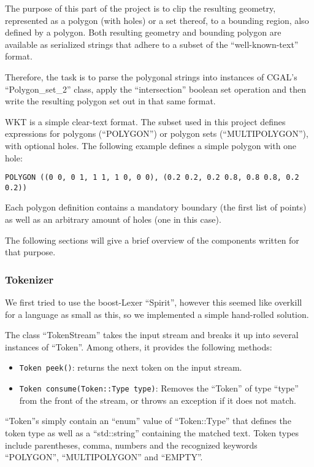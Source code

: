 The purpose of this part of the project is to clip the resulting geometry, represented as a
polygon (with holes) or a set thereof, to a bounding region, also defined by a polygon.
Both resulting geometry and bounding polygon are available as serialized strings that adhere to
a subset of the ``well-known-text'' format.

Therefore, the task is to parse the polygonal strings into instances of CGAL's ``Polygon\_set\_2''
class, apply the ``intersection'' boolean set operation and then write the resulting polygon set
out in that same format.

WKT is a simple clear-text format. The subset used in this project defines expressions for polygons
(``POLYGON'') or polygon sets (``MULTIPOLYGON''), with optional holes.
The following example defines a simple polygon with one hole:

\texttt{POLYGON ((0 0, 0 1, 1 1, 1 0, 0 0), (0.2 0.2, 0.2 0.8, 0.8 0.8, 0.2 0.2))}

Each polygon definition contains a mandatory boundary (the first list of points) as well as an
arbitrary amount of holes (one in this case).

The following sections will give a brief overview of the components written for that purpose.

\subsubsection{Tokenizer}

We first tried to use the boost-Lexer ``Spirit'', however this seemed like overkill for a language as small
as this, so we implemented a simple hand-rolled solution.

The class ``TokenStream'' takes the input stream and breaks it up into several instances of ``Token''.
Among others, it provides the following methods:

\begin{itemize}
\item \texttt{Token peek()}: returns the next token on the input stream.
\item \texttt{Token consume(Token::Type type)}: Removes the ``Token'' of type ``type'' from the front of the stream, or
  throws an exception if it does not match.
\end{itemize}
  
``Token''s simply contain an ``enum'' value of ``Token::Type'' that defines the token type as well as a
``std::string'' containing the matched text. Token types include parentheses, comma, numbers and the
recognized keywords ``POLYGON'', ``MULTIPOLYGON'' and ``EMPTY''.


